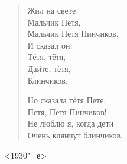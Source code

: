 \begin{verse}
Жил на свете\\
Мальчик Петя,\\
Мальчик Петя Пинчиков.\\
И сказал он:\\
Тётя, тётя,\\
Дайте, тётя,\\
Блинчиков.

Но сказала тётя Пете:\\
Петя, Петя Пинчиков!\\
Не люблю я, когда дети\\
Очень клянчут блинчиков.
\end{verse}

\begin{flushright}
<1930"=е>
\end{flushright}
